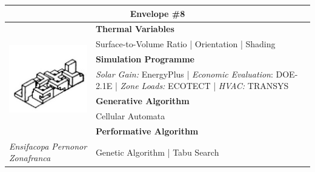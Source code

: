 \begin{table}
	\begin{tabular}{ | m{6cm} | m{14cm} |}
	\toprule
	\multicolumn{2}{c}{Envelope \#{}8} \\[1cm] \hline
	\multirow{7}{*}{\includegraphics[width=5.2cm]{./Images/17-Envelope8}} & \textbf{Thermal Variables} \\[1cm]
	& Surface-to-Volume Ratio | Orientation | Shading\vspace{0.5cm}\\ \cline{2-2}
		 & \textbf{Simulation Programme} \\[1cm]
		 & \emph{Solar Gain:} EnergyPlus | \emph{Economic Evaluation}: DOE-2.1E | \emph{Zone Loads:} ECOTECT | \emph{HVAC:} TRANSYS \vspace{0.5cm}\\ \cline{2-2}
		 & \textbf{Generative Algorithm} \\[1cm]
		 & Cellular Automata\vspace{0.5cm}\\ \cline{2-2}
		 & \textbf{Performative Algorithm} \\[1cm]
		 \emph{Ensifacopa Pernonor Zonafranca} & Genetic Algorithm | Tabu Search \vspace{0.5cm}\\
	\bottomrule
	\end{tabular}
\end{table}

\clearpage

